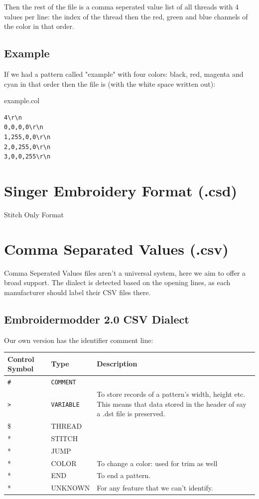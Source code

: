 \documentclass{report}
\begin{document}
Then the rest of the file is a comma seperated value list of all threads with 4 values per line: the index of the thread then the red, green and blue channels of the color in that order.

\subsection{Example}

If we had a pattern called "example" with four colors: black, red, magenta and cyan in that order then the file is (with the white space written out):

example.col

\begin{verbatim}
4\r\n
0,0,0,0\r\n
1,255,0,0\r\n
2,0,255,0\r\n
3,0,0,255\r\n
\end{verbatim}

\section{Singer Embroidery Format (.csd)}

Stitch Only Format

\section{Comma Separated Values (.csv)}

Comma Seperated Values files aren't a universal system, here we aim to
offer a broad support. The dialect is detected based on the opening lines,
as each manufacturer should label their CSV files there.

\subsection{Embroidermodder 2.0 CSV Dialect}

Our own version has the identifier comment line:

\begin{longtable}{l l p{8cm}}
Control Symbol & Type & Description \\
\hline
\texttt{\#} & \texttt{COMMENT} & \\
\texttt{>} & \texttt{VARIABLE} & To store records of a pattern's width, height etc. This means that data stored in the header of say a .dst file is preserved. \\
\$ & THREAD & \\
* & STITCH & \\
* & JUMP & \\
* & COLOR & To change a color: used for trim as well \\
* & END & To end a pattern. \\
* & UNKNOWN & For any feature that we can't identify.
\end{longtable}
\end{document}
